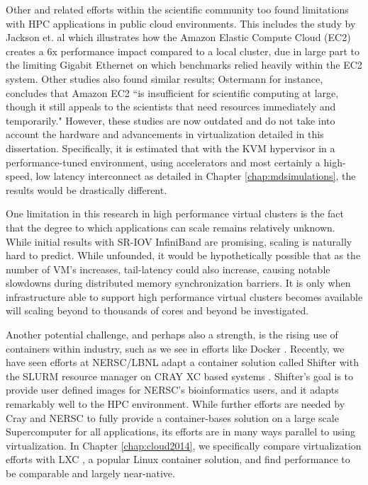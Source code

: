 Other and related efforts within the scientific community too found limitations with HPC applications in public cloud environments. This includes the study by Jackson et. al \cite{jackson2010performance} which illustrates how the Amazon Elastic Compute Cloud (EC2) creates a 6x performance impact compared to a local cluster, due in large part to the limiting Gigabit Ethernet on which benchmarks relied heavily within the EC2 system. Other studies also found similar results; Ostermann \cite{ostermann2009performance} for instance, concludes that Amazon EC2 ``is insufficient for scientific computing at large, though it still appeals to the scientists that need resources immediately and temporarily."  However, these studies are now outdated and do not take into account the hardware and advancements in virtualization detailed in this dissertation. Specifically, it is estimated that with the KVM hypervisor in a performance-tuned environment, using accelerators and most certainly a high-speed, low latency interconnect as detailed in Chapter \ref{chap:mdsimulations}, the results would be drastically different. 


One limitation in this research in high performance virtual clusters is the fact that the degree to which applications can scale remains relatively unknown. While initial results with SR-IOV InfiniBand are promising, scaling is naturally hard to predict. While unfounded, it would be hypothetically possible that as the number of VM's increases, tail-latency could also increase, causing notable slowdowns during distributed memory synchronization barriers. It is only when infrastructure able to support high performance virtual clusters becomes available will scaling beyond to thousands of cores and beyond be investigated.  

Another potential challenge, and perhaps also a strength, is the rising use of containers within industry, such as we see in efforts like Docker \cite{merkel2014docker}. Recently, we have seen efforts at NERSC/LBNL adapt a container solution called Shifter with the SLURM resource manager on CRAY XC based systems \cite{jacobsen2015contain}. Shifter's goal is to provide user defined images for NERSC's bioinformatics users, and it adapts remarkably well to the HPC environment. While further efforts are needed by Cray and NERSC to fully provide a container-bases solution on a large scale Supercomputer for all applications, its efforts are in many ways parallel to using virtualization. In Chapter \ref{chap:cloud2014}, we specifically compare virtualization efforts with LXC \cite{xavier2013performance}, a popular Linux container solution, and find performance to be comparable and largely near-native. 

